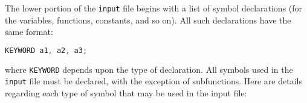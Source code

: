 The lower portion of the \texttt{input} file begins with a list of symbol declarations (for the variables, functions, constants, and so on). All such declarations have the same format:
\begin{center}\begin{minipage}{0.9\linewidth}

\begin{lstlisting}[language=c++, caption=Adapted from \cite{BM13}, captionpos=b]
KEYWORD a1, a2, a3;
\end{lstlisting}
\end{minipage}\end{center}

where \texttt{KEYWORD} depends upon the type of declaration. All symbols used in the \texttt{input} file must be declared, with the exception of subfunctions. Here are details regarding each type of symbol that may be used in the input file:

